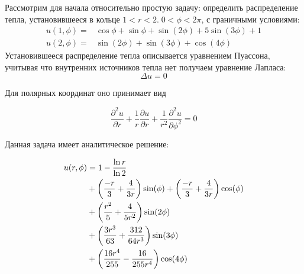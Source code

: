 \documentclass[a4paper,14pt]{extarticle} %
\begin{document}
Рассмотрим для начала относительно простую задачу: определить распределение тепла, установившееся в кольце $1<r<2.\; 0<\phi<2\pi$, с граничными условиями:
\begin{equation}
    \begin{aligned}
        u(1,\phi)=&\cos\phi+\sin\phi+\sin(2\phi)+5\sin(3\phi)+1\\
        u(2,\phi)=&\sin(2\phi)+\sin(3\phi)+\cos(4\phi)
    \end{aligned}
\end{equation}
Установившееся распределение тепла описывается уравнением Пуассона, учитывая что внутренних источников тепла нет получаем уравнение Лапласа:
\begin{equation}
    \Delta u = 0
\end{equation}

Для полярных координат оно принимает вид

\begin{equation}
    \frac{\partial^2 u}{\partial r} + \frac{1}{r} \frac{\partial u}{\partial r} + \frac{1}{r^2}\frac{\partial^2 u}{\partial \phi^2} = 0
\end{equation}

Данная задача имеет аналитическое решение:

\begin{equation}\label{eq:termal}
    \begin{split}
        u(r,\phi) & = 1-\frac{\ln r}{\ln 2}\\
        &+{\left( \frac{-r}{3}+\frac{4}{3r} \right)}\sin(\phi)+{\left( \frac{-r}{3}+\frac{4}{3r} \right)}\cos(\phi)\\
        &+{\left( \frac{r^2}{5}+\frac{4}{5r^2} \right)}\sin(2\phi)\\
        &+{\left( \frac{3r^3}{63}+\frac{312}{64r^3} \right)}\sin(3\phi)\\
        &+{\left( \frac{16r^4}{255}-\frac{16}{255r^4} \right)}\cos(4\phi)
    \end{split}
\end{equation}


\end{document}
